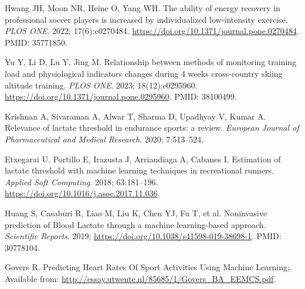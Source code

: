 \documentclass[a4paper,fleqn]{cas-dc}
\begin{document}
\begin{thebibliography}{}
 Hwang JH, Moon NR, Heine O, Yang WH. The ability of energy recovery in professional soccer players is increased by individualized low-intensity exercise. \textit{PLOS ONE}. 2022; 17(6):e0270484. \url{https://doi.org/10.1371/journal.pone.0270484}. PMID: 35771850.

 Yu Y, Li D, Lu Y, Jing M. Relationship between methods of monitoring training load and physiological indicators changes during 4 weeks cross-country skiing altitude training. \textit{PLOS ONE}. 2023; 18(12):e0295960. \url{https://doi.org/10.1371/journal.pone.0295960}. PMID: 38100499.

 Krishnan A, Sivaraman A, Alwar T, Sharma D, Upadhyay V, Kumar A. Relevance of lactate threshold in endurance sports: a review. \textit{European Journal of Pharmaceutical and Medical Research}. 2020; 7:513–524.

 Etxegarai U, Portillo E, Irazusta J, Arriandiaga A, Cabanes I. Estimation of lactate threshold with machine learning techniques in recreational runners. \textit{Applied Soft Computing}. 2018; 63:181–196. \url{https://doi.org/10.1016/j.asoc.2017.11.036}.

 Huang S, Casaburi R, Liao M, Liu K, Chen YJ, Fu T, et al. Noninvasive prediction of Blood Lactate through a machine learning-based approach. \textit{Scientific Reports}. 2019; \url{https://doi.org/10.1038/s41598-019-38698-1}. PMID: 30778104.

 Govers R. Predicting Heart Rates Of Sport Activities Using Machine Learning;. Available from: \url{http://essay.utwente.nl/85685/1/Govers_BA_EEMCS.pdf}.

\end{thebibliography}
\end{document}
